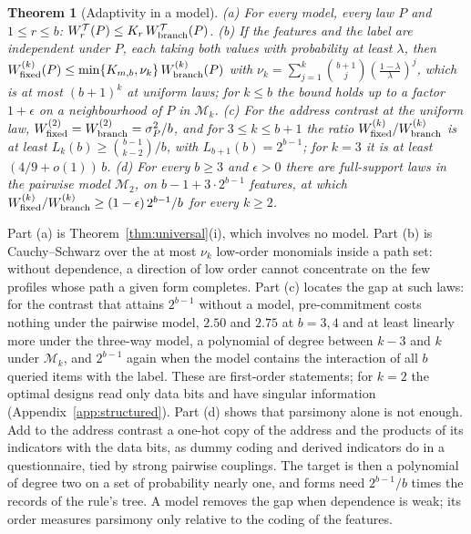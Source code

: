 \documentclass{article}
\newtheorem{theorem}{Theorem}
\begin{document}
\begin{theorem}[Adaptivity in a model]\label{thm:structured}
\textup{(a)} For every model, every law $P$ and $1\le r\le b$: $W^{\mathcal T}_r(P)\le K_r\,W^{\mathcal T}_{\rm branch}(P)$.
\textup{(b)} If the features and the label are independent under $P$, each taking both values with probability at least $\lambda$, then $W^{(k)}_{\rm fixed}(P)\le\min\{K_{m,b},\nu_k\}\,W^{(k)}_{\rm branch}(P)$ with $\nu_k=\sum_{j=1}^k\binom{b+1}j(\frac{1-\lambda}\lambda)^j$, which is at most $(b+1)^k$ at uniform laws; for $k\le b$ the bound holds up to a factor $1+\epsilon$ on a neighbourhood of $P$ in $\mathcal M_k$.
\textup{(c)} For the address contrast at the uniform law, $W^{(2)}_{\rm fixed}=W^{(2)}_{\rm branch}=\sigma_P^2/b$, and for $3\le k\le b+1$ the ratio $W^{(k)}_{\rm fixed}/W^{(k)}_{\rm branch}$ is at least $L_k(b)\ge\binom{b-1}{k-2}/b$, with $L_{b+1}(b)=2^{b-1}$; for $k=3$ it is at least $(4/9+o(1))\,b$.
\textup{(d)} For every $b\ge3$ and $\epsilon>0$ there are full-support laws in the pairwise model $\mathcal M_2$, on $b-1+3\cdot2^{b-1}$ features, at which $W^{(k)}_{\rm fixed}/W^{(k)}_{\rm branch}\ge(1-\epsilon)\,2^{b-1}/b$ for every $k\ge2$.
\end{theorem}
Part (a) is Theorem~\ref{thm:universal}(i), which involves no model. Part (b) is Cauchy--Schwarz over the at most $\nu_k$ low-order monomials inside a path set: without dependence, a direction of low order cannot concentrate on the few profiles whose path a given form completes. Part (c) locates the gap at such laws: for the contrast that attains $2^{b-1}$ without a model, pre-commitment costs nothing under the pairwise model, $2.50$ and $2.75$ at $b=3,4$ and at least linearly more under the three-way model, a polynomial of degree between $k-3$ and $k$ under $\mathcal M_k$, and $2^{b-1}$ again when the model contains the interaction of all $b$ queried items with the label. These are first-order statements; for $k=2$ the optimal designs read only data bits and have singular information (Appendix~\ref{app:structured}). Part (d) shows that parsimony alone is not enough. Add to the address contrast a one-hot copy of the address and the products of its indicators with the data bits, as dummy coding and derived indicators do in a questionnaire, tied by strong pairwise couplings. The target is then a polynomial of degree two on a set of probability nearly one, and forms need $2^{b-1}/b$ times the records of the rule's tree. A model removes the gap when dependence is weak; its order measures parsimony only relative to the coding of the features.
\end{document}
